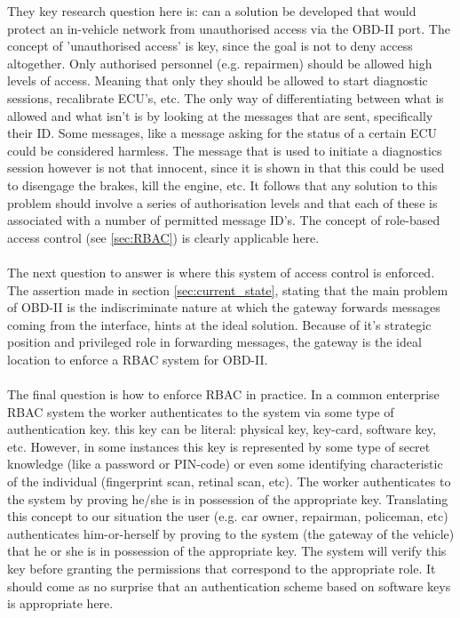 They key research question here is: can a solution be developed that would protect an in-vehicle network from unauthorised access via the OBD-II port. The concept of 'unauthorised access' is key, since the goal is not to deny access altogether. Only authorised personnel (e.g. repairmen) should be allowed high levels of access. Meaning that only they should be allowed to start diagnostic sessions, recalibrate ECU's, etc. The only way of differentiating between what is allowed and what isn't is by looking at the messages that are sent, specifically their ID. Some messages, like a message asking for the status of a certain ECU could be considered harmless. The message that is used to initiate a diagnostics session however is not that innocent, since it is shown in \cite{MillerC} that this could be used to disengage the brakes, kill the engine, etc. It follows that any solution to this problem should involve a series of authorisation levels and that each of these is associated with a number of permitted message ID's. The concept of role-based access control (see \ref{sec:RBAC}) is clearly applicable here. \\ \\ The next question to answer is where this system of access control is enforced. The assertion made in section \ref{sec:current_state}, stating that the main problem of OBD-II is the indiscriminate nature at which the gateway forwards messages coming from the interface, hints at the ideal solution. Because of it's strategic position and privileged role in forwarding messages, the gateway is the ideal location to enforce a RBAC system for OBD-II. \\ \\ The final question is how to enforce RBAC in practice. In a common enterprise RBAC system the worker authenticates to the system via some type of authentication key. this key can be literal: physical key, key-card, software key, etc. However, in some instances this key is represented by some type of secret knowledge (like a password or PIN-code) or even some identifying characteristic of the individual (fingerprint scan, retinal scan, etc). The  worker authenticates to the system by proving he/she is in possession of the appropriate key. Translating this concept to our situation the user (e.g. car owner, repairman, policeman, etc) authenticates him-or-herself by proving to the system (the gateway of the vehicle) that he or she is in possession of the appropriate key. The system will verify this key before granting the permissions that correspond to the appropriate role. It should come as no surprise that an authentication scheme based on software keys is appropriate here.


